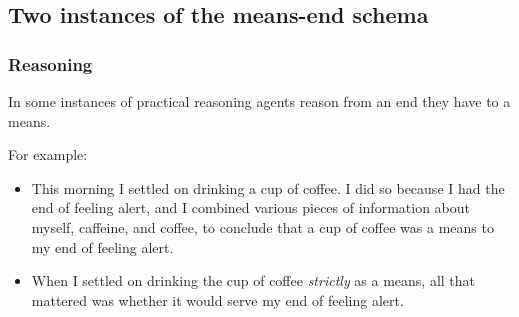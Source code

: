 \documentclass[10pt]{article}
\newcommand{\hozlinedash}[0]{%
  \noindent\hdashrule[0.5ex][c]{\textwidth}{.1pt}{2.5pt}
}
\begin{document}

\hozlinedash

\newpage

\subsection{Two instances of the means-end schema}
\label{sec:two-instances-means}

\subsubsection{Reasoning}
\label{sec:reasoning}

In some instances of practical reasoning agents reason from an end they have to a means.

For example:
\begin{itemize}
\item This morning I settled on drinking a cup of coffee. I did so because I had the end of feeling alert, and I combined various pieces of information about myself, caffeine, and coffee, to conclude that a cup of coffee was a means to my end of feeling alert.
\item When I settled on drinking the cup of coffee \emph{strictly} as a means, all that mattered was whether it would serve my end of feeling alert.
\end{itemize}
\end{document}
